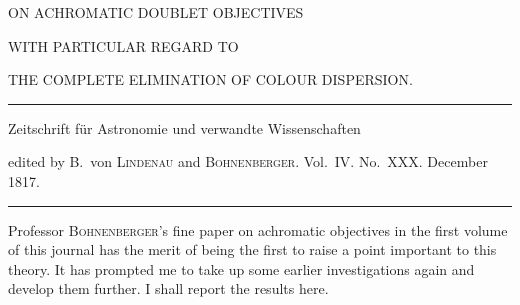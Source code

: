 \begin{center}
{\Large ON ACHROMATIC DOUBLET OBJECTIVES\par}
\vspace{6mm}
{\large WITH PARTICULAR REGARD TO\par}
\vspace{4mm}
{\large THE COMPLETE ELIMINATION OF COLOUR DISPERSION.\par}
\vspace{7mm}\hrule\vspace{2mm}
Zeitschrift für Astronomie und verwandte Wissenschaften\par
edited by B.\ von \textsc{Lindenau} and \textsc{Bohnenberger}. Vol.\ IV. No.\ XXX. December 1817.
\vspace{2mm}\hrule\vspace{5mm}
\end{center}
Professor \textsc{Bohnenberger}'s fine paper on achromatic objectives in the first volume of this journal has the merit of being the first to raise a point important to this theory. It has prompted me to take up some earlier investigations again and develop them further. I shall report the results here.

